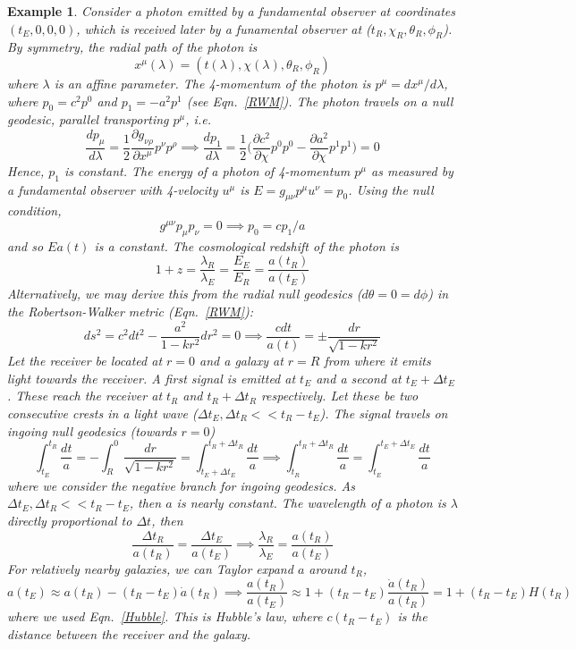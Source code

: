 \documentclass[a4paper]{article}
\newtheorem{eg}{Example}[section]
\theoremstyle{new}
\begin{document}
\begin{eg}
Consider a photon emitted by a fundamental observer at coordinates $(t_E,0,0,0)$, which is received later by a funamental observer at ($t_R,\chi_R,\theta_R,\phi_R$). By symmetry, the radial path of the photon is
$$x^\mu(\lambda)=(t(\lambda),\chi(\lambda),\theta_R,\phi_R)$$
where $\lambda$ is an affine parameter. The 4-momentum of the photon is $p^\mu=dx^\mu/d\lambda$, where $p_0=c^2p^0$ and $p_1=-a^2p^1$ (see Eqn.~\ref{RWM}). The photon travels on a null geodesic, parallel transporting $p^\mu$, i.e.
$$\frac{dp_\mu}{d\lambda}=\frac{1}{2}\frac{\partial g_{\nu\rho}}{\partial x^\mu}p^\nu p^\rho\implies\frac{dp_1}{d\lambda}=\frac{1}{2}\bigg(\frac{\partial c^2}{\partial \chi}p^0p^0-\frac{\partial a^2}{\partial\chi}p^1p^1\bigg)=0$$
Hence, $p_1$ is constant. The energy of a photon of 4-momentum $p^\mu$ as measured by a fundamental observer with 4-velocity $u^\mu$ is $E=g_{\mu\nu}p^\mu u^\nu=p_0$. Using the null condition,
$$g^{\mu\nu}p_\mu p_\nu=0\implies p_0=cp_1/a$$
and so $Ea(t)$ is a constant. The cosmological redshift of the photon is 
\begin{equation}
1+z=\frac{\lambda_R}{\lambda_E}=\frac{E_E}{E_R}=\frac{a(t_R)}{a(t_E)}\label{cosmoredshift}
\end{equation}
Alternatively, we may derive this from the radial null geodesics ($d\theta=0=d\phi$) in the Robertson-Walker metric (Eqn.~\ref{RWM}):
$$ds^2=c^2dt^2-\frac{a^2}{1-kr^2}dr^2=0\implies\frac{cdt}{a(t)}=\pm\frac{dr}{\sqrt{1-kr^2}}$$
Let the receiver be located at $r=0$ and a galaxy at $r=R$ from where it emits light towards the receiver. A first signal is emitted at $t_E$ and a second at $t_E+\Delta t_E$. These reach the receiver at $t_R$ and $t_R+\Delta t_R$ respectively. Let these be two consecutive crests in a light wave ($\Delta t_E,\Delta t_R<<t_R-t_E$). The signal travels on ingoing null geodesics (towards $r=0$)
$$\int_{t_E}^{t_R}\frac{dt}{a}=-\int_R^0\frac{dr}{\sqrt{1-kr^2}}=\int_{t_E+\Delta t_E}^{t_R+\Delta t_R}\frac{dt}{a}\implies\int_{t_R}^{t_R+\Delta t_R}\frac{dt}{a}=\int_{t_E}^{t_E+\Delta t_E}\frac{dt}{a}$$
where we consider the negative branch for ingoing geodesics. As $\Delta t_E,\Delta t_R<<t_R-t_E$, then $a$ is nearly constant. The wavelength of a photon is $\lambda$ directly proportional to $\Delta t$, then
$$\frac{\Delta t_R}{a(t_R)}=\frac{\Delta t_E}{a(t_E)}\implies\frac{\lambda_R}{\lambda_E}=\frac{a(t_R)}{a(t_E)}$$
For relatively nearby galaxies, we can Taylor expand $a$ around $t_R$, 
$$a(t_E)\approx a(t_R)-(t_R-t_E)\dot{a}(t_R)\implies\frac{a(t_R)}{a(t_E)}\approx 1+(t_R-t_E)\frac{\dot{a}(t_R)}{a(t_R)}=1+(t_R-t_E)H(t_R)$$
where we used Eqn.~\ref{Hubble}. This is Hubble's law, where $c(t_R-t_E)$ is the distance between the receiver and the galaxy.
\end{eg}
\end{document}
